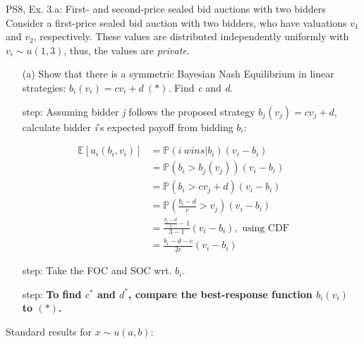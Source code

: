 \begin{frame}{PS8, Ex. 3.a: First- and second-price sealed bid auctions with two bidders}
    Consider a first-price sealed bid auction with two bidders, who have valuations $v_1$ and $v_2$, respectively. These values are distributed independently uniformly with $v_i\sim u(1,3)$, thus, the values are \textit{private}.
    \vspace{-4pt}
    \begin{itemize}
      \item[(a)] Show that there is a symmetric Bayesian Nash Equilibrium in linear strategies: $b_i(v_i) = cv_i + d\ (*)$. Find \textit{c} and \textit{d}.
    \end{itemize}
    \vspace{-8pt}
    \begin{multicols}{2}
      \begin{itemize}
        \item[\nth{1} step:] Assuming bidder \textit{j} follows the proposed strategy $b_j(v_j) = cv_j + d$, calculate bidder \textit{i}'s expected payoff from bidding $b_i$:
      \end{itemize}
      \vspace{-12pt}
      \begin{align*}
        \mathbb{E}[u_i(b_i,v_i)]&=\mathbb{P}(i\ wins|b_i)(v_i-b_i)\\
                                &=\mathbb{P}(b_i>b_j(v_j))(v_i-b_i)\\
                                &=\mathbb{P}(b_i>cv_j+d)(v_i-b_i)\\
                                &=\mathbb{P}\left(\frac{b_i-d}{c}>v_j\right)(v_i-b_i)\\
                                &=\frac{\frac{b_i-d}{c}-1}{3-1}(v_i-b_i),\text{ using CDF}\\
                                &=\frac{b_i-d-c}{2c}(v_i-b_i)
      \end{align*}
      \vspace{-18pt}
      \begin{itemize}
        \item[\nth{2} step:] Take the FOC and SOC wrt. $b_i$.
        \item[\nth{3} step:] \textbf{To find $c^*$ and $d^*$, compare the best-response function $b_i(v_i)$ to $(*)$.}
      \end{itemize}
      \vfill\null\columnbreak
      Standard results for $x\sim u(a, b):$
      \vspace{-6pt}

\end{multicols}
\end{frame}
